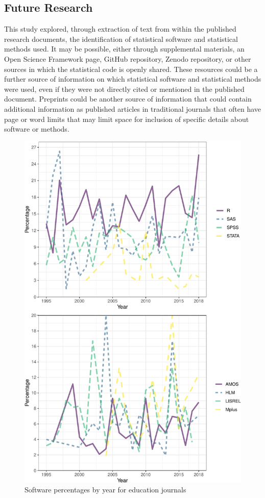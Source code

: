 \documentclass[
  english,
  ,man]{apa7}
\begin{document}
\hypertarget{future-research}{%
\subsection{Future Research}\label{future-research}}

This study explored, through extraction of text from within the published research documents, the identification of statistical software and statistical methods used. It may be possible, either through supplemental materials, an Open Science Framework page, GitHub repository, Zenodo repository, or other sources in which the statistical code is openly shared. These resources could be a further source of information on which statistical software and statistical methods were used, even if they were not directly cited or mentioned in the published document. Preprints could be another source of information that could contain additional information as published articles in traditional journals that often have page or word limits that may limit space for inclusion of specific details about software or methods.

\newpage

\begin{figure}
\centering
\includegraphics{software_files/figure-latex/software-year-at1-1.pdf}
\caption{\label{fig:software-year-at1}Software percentages by year for education journals}
\end{figure}
\end{document}

